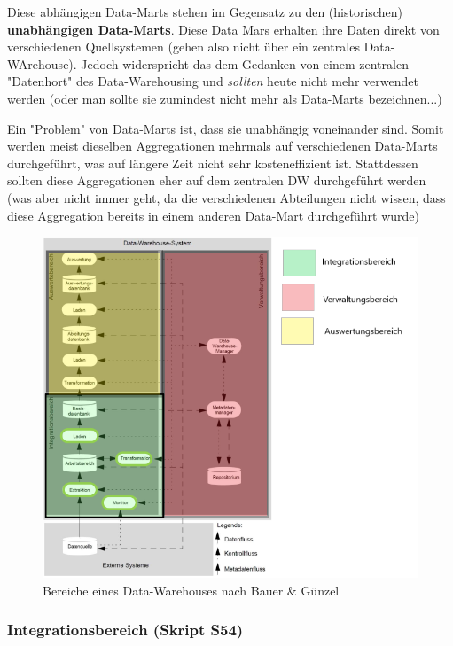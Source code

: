 \documentclass[a4paper, 11pt, nofootinbib]{article}
\begin{document}
 Diese abhängigen Data-Marts stehen im Gegensatz zu den (historischen) \textbf{unabhängigen Data-Marts}. Diese Data Mars erhalten ihre Daten direkt von verschiedenen Quellsystemen (gehen also nicht über ein zentrales Data-WArehouse). Jedoch widerspricht das dem Gedanken von einem zentralen "Datenhort" des Data-Warehousing und \textit{sollten} heute nicht mehr verwendet werden (oder man sollte sie zumindest nicht mehr als Data-Marts bezeichnen...)

Ein "Problem" von Data-Marts ist, dass sie unabhängig voneinander sind. Somit werden meist dieselben Aggregationen mehrmals auf verschiedenen Data-Marts durchgeführt, was auf längere Zeit nicht sehr kosteneffizient ist. Stattdessen sollten diese Aggregationen eher auf dem zentralen DW durchgeführt werden (was aber nicht immer geht, da die verschiedenen Abteilungen nicht wissen, dass diese Aggregation bereits in einem anderen Data-Mart durchgeführt wurde)

\newpage

\begin{figure}[htb]
	\centering
	\includegraphics[keepaspectratio=true,height=18\baselineskip]{DWH_Bereiche.png}
	\caption{Bereiche eines Data-Warehouses nach Bauer \& Günzel}
	\label{fig:bereiche}
\end{figure}

\subsubsection{Integrationsbereich (Skript S54)}
\end{document}
